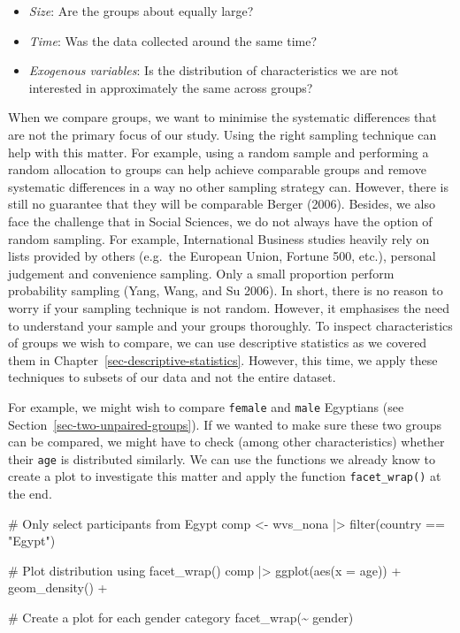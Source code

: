 \documentclass[
  letterpaper,
  DIV=11,
  numbers=noendperiod]{scrreprt}
\newenvironment{Shaded}{\begin{snugshade}}{\end{snugshade}}
\newcommand{\AttributeTok}[1]{\textcolor[rgb]{0.40,0.45,0.13}{#1}}
\newcommand{\CommentTok}[1]{\textcolor[rgb]{0.37,0.37,0.37}{#1}}
\newcommand{\FunctionTok}[1]{\textcolor[rgb]{0.28,0.35,0.67}{#1}}
\newcommand{\NormalTok}[1]{\textcolor[rgb]{0.00,0.23,0.31}{#1}}
\newcommand{\OtherTok}[1]{\textcolor[rgb]{0.00,0.23,0.31}{#1}}
\newcommand{\SpecialCharTok}[1]{\textcolor[rgb]{0.37,0.37,0.37}{#1}}
\newcommand{\StringTok}[1]{\textcolor[rgb]{0.13,0.47,0.30}{#1}}
\begin{document}
\begin{itemize}
\item
  \emph{Size}: Are the groups about equally large?
\item
  \emph{Time}: Was the data collected around the same time?
\item
  \emph{Exogenous variables}: Is the distribution of characteristics we
  are not interested in approximately the same across groups?
\end{itemize}

When we compare groups, we want to minimise the systematic differences
that are not the primary focus of our study. Using the right sampling
technique can help with this matter. For example, using a random sample
and performing a random allocation to groups can help achieve comparable
groups and remove systematic differences in a way no other sampling
strategy can. However, there is still no guarantee that they will be
comparable Berger (2006). Besides, we also face the challenge that in
Social Sciences, we do not always have the option of random sampling.
For example, International Business studies heavily rely on lists
provided by others (e.g.~the European Union, Fortune 500, etc.),
personal judgement and convenience sampling. Only a small proportion
perform probability sampling (Yang, Wang, and Su 2006). In short, there
is no reason to worry if your sampling technique is not random. However,
it emphasises the need to understand your sample and your groups
thoroughly. To inspect characteristics of groups we wish to compare, we
can use descriptive statistics as we covered them in
Chapter~\ref{sec-descriptive-statistics}. However, this time, we apply
these techniques to subsets of our data and not the entire dataset.

For example, we might wish to compare \texttt{female} and \texttt{male}
Egyptians (see Section~\ref{sec-two-unpaired-groups}). If we wanted to
make sure these two groups can be compared, we might have to check
(among other characteristics) whether their \texttt{age} is distributed
similarly. We can use the functions we already know to create a plot to
investigate this matter and apply the function \texttt{facet\_wrap()} at
the end.

\begin{Shaded}
\begin{Highlighting}[]
\CommentTok{\# Only select participants from \textquotesingle{}Egypt\textquotesingle{}}
\NormalTok{comp }\OtherTok{\textless{}{-}}
\NormalTok{  wvs\_nona }\SpecialCharTok{|\textgreater{}}
  \FunctionTok{filter}\NormalTok{(country }\SpecialCharTok{==} \StringTok{"Egypt"}\NormalTok{)}

\CommentTok{\# Plot distribution using facet\_wrap()}
\NormalTok{comp }\SpecialCharTok{|\textgreater{}}
  \FunctionTok{ggplot}\NormalTok{(}\FunctionTok{aes}\NormalTok{(}\AttributeTok{x =}\NormalTok{ age)) }\SpecialCharTok{+}
  \FunctionTok{geom\_density}\NormalTok{() }\SpecialCharTok{+}
  
  \CommentTok{\# Create a plot for each gender category}
  \FunctionTok{facet\_wrap}\NormalTok{(}\SpecialCharTok{\textasciitilde{}}\NormalTok{ gender)}
\end{Highlighting}
\end{Shaded}
\end{document}
